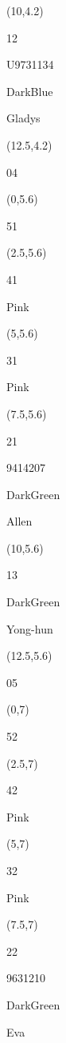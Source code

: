 \documentclass[a4paper]{article}
\newcommand{\myseat}[4]{%
\vspace{-0.1cm}
\parbox[t][2.2cm][t]{3.5cm}{
\small #1 %
\begin{description}
\vspace{-0.1cm}
\item [ID:] #2
\vspace{-0.1cm}
\item [Team:] #3 \normalsize
\vspace{-0.1cm}
\item \normalsize #4
\vspace{-0.1cm}
\end{description}
}
}
\begin{document}
\begin{CJK}{UTF8}{cyberbit}
\begin{textblock}{2.5}(10,4.2)
	\myseat{12}{U9731134}{DarkBlue}{Gladys}
\end{textblock}

\begin{textblock}{2.5}(12.5,4.2)
\textblockcolor{}
	\myseat{04}{}{}{}
\end{textblock}

\begin{textblock}{2.5}(0,5.6)
\textblockcolor{}
\myseat{51}{}{}{}
\end{textblock}

\begin{textblock}{2.5}(2.5,5.6)
\myseat{41}{}{Pink}{}
\end{textblock}

\begin{textblock}{2.5}(5,5.6)
\myseat{31}{}{Pink}{}
\end{textblock}

\begin{textblock}{2.5}(7.5,5.6)
\myseat{21}{9414207}{DarkGreen}{Allen}
\end{textblock}

\begin{textblock}{2.5}(10,5.6)
\myseat{13}{}{DarkGreen}{Yong-hun}
\end{textblock}

\begin{textblock}{2.5}(12.5,5.6)
\textblockcolor{}
\myseat{05}{}{}{}
\end{textblock}

\begin{textblock}{2.5}(0,7)
\textblockcolor{}
\myseat{52}{}{}{}
\end{textblock}

\begin{textblock}{2.5}(2.5,7)
\myseat{42}{}{Pink}{}
\end{textblock}

\begin{textblock}{2.5}(5,7)
\myseat{32}{}{Pink}{}
\end{textblock}

\begin{textblock}{2.5}(7.5,7)
\myseat{22}{9631210}{DarkGreen}{Eva}
\end{textblock}


\end{CJK}
\end{document}
